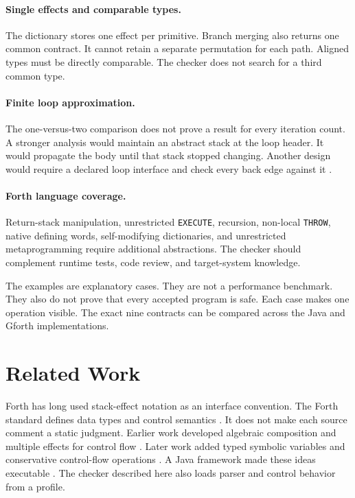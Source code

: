 \documentclass[11pt,a4paper]{article}
\begin{document}
\paragraph{Single effects and comparable types.}
The dictionary stores one effect per primitive.  Branch merging also returns
one common contract.  It cannot retain a separate permutation for each path.
Aligned types must be directly comparable.  The checker does not search for a
third common type.

\paragraph{Finite loop approximation.}
The one-versus-two comparison does not prove a result for every iteration
count.  A stronger analysis would maintain an abstract stack at the loop
header.  It would propagate the body until that stack stopped changing.
Another design would require a declared loop interface and check every back
edge against it \cite{cousot1977}.

\paragraph{Forth language coverage.}
Return-stack manipulation, unrestricted \texttt{EXECUTE}, recursion,
non-local \texttt{THROW}, native defining words, self-modifying dictionaries,
and unrestricted metaprogramming require additional abstractions.  The checker
should complement runtime tests, code review, and target-system knowledge.

The examples are explanatory cases.  They are not a performance benchmark.
They also do not prove that every accepted program is safe.  Each case makes
one operation visible.  The exact nine contracts can be compared across the
Java and Gforth implementations.

\section{Related Work}

Forth has long used stack-effect notation as an interface convention.  The
Forth standard defines data types and control semantics \cite{forth2012}.  It
does not make each source comment a static judgment.  Earlier work developed
algebraic composition and multiple effects for control flow
\cite{poial1994,poial1992}.  Later work added typed symbolic variables and
conservative control-flow operations \cite{poial2002,poial2006}.  A Java
framework made these ideas executable \cite{poial2008}.  The checker described
here also loads parser and control behavior from a profile.
\end{document}
